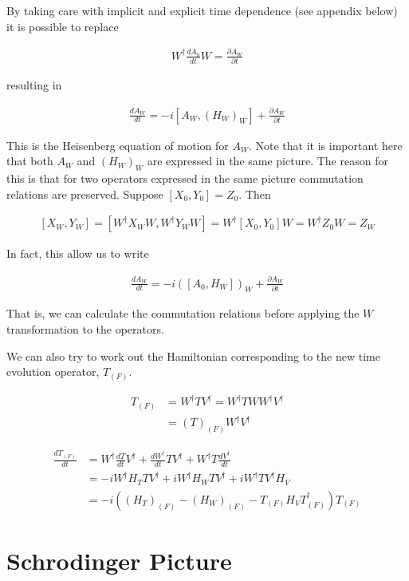 \documentclass[12pt]{article}
\newcommand{\ddt}[1]{\frac{d #1}{dt}}
\newcommand{\ppt}[1]{\frac{\partial #1}{\partial t}}
\begin{document}
By taking care with implicit and explicit time dependence (see appendix below) it is possible to replace

\begin{align}
W^{\dag} \ddt{A_0} W = \ppt{A_W}
\end{align}

resulting in

\begin{align}
\boxed{
\ddt{A_W} = -i\left[A_W,(H_W)_W\right] + \ppt{A_W}
}
\end{align}

This is the Heisenberg equation of motion for $A_W$. Note that it is important here that both $A_W$ and $(H_W)_W$ are expressed in the same picture. The reason for this is that for two operators expressed in the same picture commutation relations are preserved. Suppose $[X_0,Y_0] = Z_0$. Then

\begin{align}
\left[X_W,Y_W\right] = \left[W^{\dag}X_W W,W^{\dag}Y_W W\right] = W^{\dag}\left[X_0,Y_0\right]W = W^{\dag}Z_0W = Z_W
\end{align}

In fact, this allow us to write

\begin{align}
\ddt{A_W} = -i \left(\left[A_0, H_W\right]\right)_W + \ppt{A_W}
\end{align}

That is, we can calculate the commutation relations before applying the $W$ transformation to the operators.

We can also try to work out the Hamiltonian corresponding to the new time evolution operator, $T_{(F)}$.

\begin{align}
T_{(F)} &= W^{\dag} T V^{\dag} = W^{\dag} T W W^{\dag} V^{\dag}\\
&= (T)_{(F)} W^{\dag} V^{\dag}
\end{align}

\begin{align}
\ddt{T_{(F)}} &= W^{\dag} \ddt{T} V^{\dag} + \ddt{W^{\dag}} T V^{\dag} + W^{\dag} T \ddt{V^{\dag}}\\
&= -i W^{\dag} H_T T V^{\dag} + iW^{\dag} H_W T V^{\dag} + i W^{\dag}T V^{\dag}H_V\\
&= -i\left((H_T)_{(F)} - (H_W)_{(F)} - T_{(F)} H_V T_{(F)}^{\dag}\right)T_{(F)}
\end{align}


\section{Schrodinger Picture}
\end{document}
